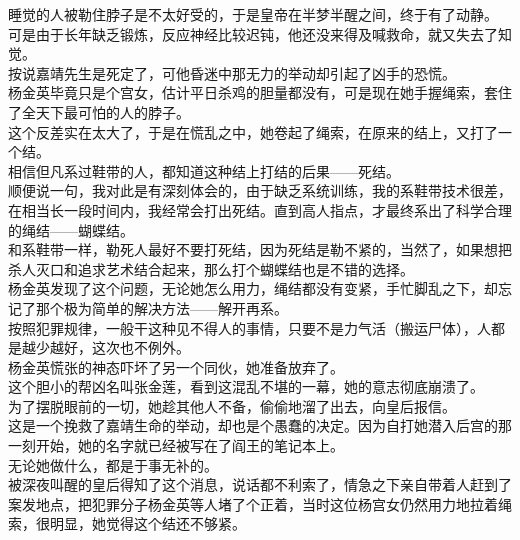 \begin{multicols}{\theparacolNo}
睡觉的人被勒住脖子是不太好受的，于是皇帝在半梦半醒之间，终于有了动静。\\

可是由于长年缺乏锻炼，反应神经比较迟钝，他还没来得及喊救命，就又失去了知觉。\\

按说嘉靖先生是死定了，可他昏迷中那无力的举动却引起了凶手的恐慌。\\

杨金英毕竟只是个宫女，估计平日杀鸡的胆量都没有，可是现在她手握绳索，套住了全天下最可怕的人的脖子。\\

这个反差实在太大了，于是在慌乱之中，她卷起了绳索，在原来的结上，又打了一个结。\\

相信但凡系过鞋带的人，都知道这种结上打结的后果——死结。\\

顺便说一句，我对此是有深刻体会的，由于缺乏系统训练，我的系鞋带技术很差，在相当长一段时间内，我经常会打出死结。直到高人指点，才最终系出了科学合理的绳结——蝴蝶结。\\

和系鞋带一样，勒死人最好不要打死结，因为死结是勒不紧的，当然了，如果想把杀人灭口和追求艺术结合起来，那么打个蝴蝶结也是不错的选择。\\

杨金英发现了这个问题，无论她怎么用力，绳结都没有变紧，手忙脚乱之下，却忘记了那个极为简单的解决方法——解开再系。\\

按照犯罪规律，一般干这种见不得人的事情，只要不是力气活（搬运尸体），人都是越少越好，这次也不例外。\\

杨金英慌张的神态吓坏了另一个同伙，她准备放弃了。\\

这个胆小的帮凶名叫张金莲，看到这混乱不堪的一幕，她的意志彻底崩溃了。\\

为了摆脱眼前的一切，她趁其他人不备，偷偷地溜了出去，向皇后报信。\\

这是一个挽救了嘉靖生命的举动，却也是个愚蠢的决定。因为自打她潜入后宫的那一刻开始，她的名字就已经被写在了阎王的笔记本上。\\

无论她做什么，都是于事无补的。\\

被深夜叫醒的皇后得知了这个消息，说话都不利索了，情急之下亲自带着人赶到了案发地点，把犯罪分子杨金英等人堵了个正着，当时这位杨宫女仍然用力地拉着绳索，很明显，她觉得这个结还不够紧。\\


\end{multicols}
